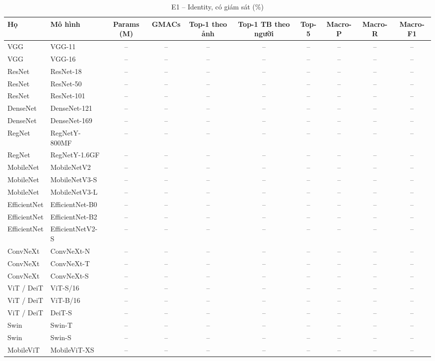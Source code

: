 \begin{table}[t]
\centering
\small
\caption{E1 – Identity, có giám sát (\%)}
\begin{tabular}{llcccccccc}
\toprule
Họ & Mô hình & Params (M) & GMACs & Top-1 theo ảnh & Top-1 TB theo người & Top-5 & Macro-P & Macro-R & Macro-F1 \\
\midrule
VGG & VGG-11 & – & – & – & – & – & – & – & – \\
VGG & VGG-16 & – & – & – & – & – & – & – & – \\
ResNet & ResNet-18 & – & – & – & – & – & – & – & – \\
ResNet & ResNet-50 & – & – & – & – & – & – & – & – \\
ResNet & ResNet-101 & – & – & – & – & – & – & – & – \\
DenseNet & DenseNet-121 & – & – & – & – & – & – & – & – \\
DenseNet & DenseNet-169 & – & – & – & – & – & – & – & – \\
RegNet & RegNetY-800MF & – & – & – & – & – & – & – & – \\
RegNet & RegNetY-1.6GF & – & – & – & – & – & – & – & – \\
MobileNet & MobileNetV2 & – & – & – & – & – & – & – & – \\
MobileNet & MobileNetV3-S & – & – & – & – & – & – & – & – \\
MobileNet & MobileNetV3-L & – & – & – & – & – & – & – & – \\
EfficientNet & EfficientNet-B0 & – & – & – & – & – & – & – & – \\
EfficientNet & EfficientNet-B2 & – & – & – & – & – & – & – & – \\
EfficientNet & EfficientNetV2-S & – & – & – & – & – & – & – & – \\
ConvNeXt & ConvNeXt-N & – & – & – & – & – & – & – & – \\
ConvNeXt & ConvNeXt-T & – & – & – & – & – & – & – & – \\
ConvNeXt & ConvNeXt-S & – & – & – & – & – & – & – & – \\
ViT / DeiT & ViT-S/16 & – & – & – & – & – & – & – & – \\
ViT / DeiT & ViT-B/16 & – & – & – & – & – & – & – & – \\
ViT / DeiT & DeiT-S & – & – & – & – & – & – & – & – \\
Swin & Swin-T & – & – & – & – & – & – & – & – \\
Swin & Swin-S & – & – & – & – & – & – & – & – \\
MobileViT & MobileViT-XS & – & – & – & – & – & – & – & – \\

\end{tabular}
\end{table}
